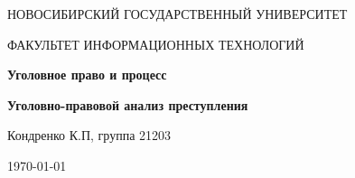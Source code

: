 \begin{center}
	{\LARGE \textsc{НОВОСИБИРСКИЙ ГОСУДАРСТВЕННЫЙ УНИВЕРСИТЕТ}\par}
	{\textsc{ФАКУЛЬТЕТ ИНФОРМАЦИОННЫХ ТЕХНОЛОГИЙ}\par}
	
	\vspace{3cm}
	
	{\huge\bfseries Уголовное право и процесс\par}
	
	\vspace{1cm}
	
	{\Large\bfseries Уголовно-правовой анализ преступления\par}
	
	\vspace{10cm}
	
	\begin{flushright}
		Кондренко К.П, группа 21203
	\end{flushright}
	
	\vfill
	
	{\large \today\par}
\end{center}